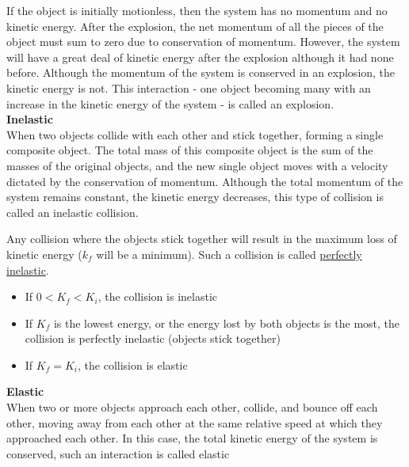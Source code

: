 \documentclass[a4paper]{article}
\let\bf\textbf
\begin{document}
If the object is initially motionless, then the system has no momentum and no kinetic energy. After the explosion, the net momentum of all the pieces of the object must sum to zero due to conservation of momentum. However, the system will have a great deal of kinetic energy after the explosion although it had none before. Although the momentum of the system is conserved in an explosion, the kinetic energy is not. This interaction - one object becoming many with an increase in the kinetic energy of the system - is called an explosion.
\vspace{2mm}\\
\bf{Inelastic}
\vspace{1mm}\\
When two objects collide with each other and stick together, forming a single composite object. The total mass of this composite object is the sum of the masses of the original objects, and the new single object moves with a velocity dictated by the conservation of momentum. Although the total momentum of the system remains constant, the kinetic energy decreases, this type of collision is called an inelastic collision.

Any collision where the objects stick together will result in the maximum loss of kinetic energy ($k_f$ will be a minimum). Such a collision is called \underline{perfectly inelastic}. 
\begin{itemize}
    \item If $0 < K_f < K_i$, the collision is inelastic
    \item If $K_f$ is the lowest energy, or the energy lost by both objects is the most, the collision is perfectly inelastic (objects stick together)
    \item If $K_f = K_i$, the collision is elastic
\end{itemize}
\bf{Elastic}
\vspace{1mm}\\
When two or more objects approach each other, collide, and bounce off each other, moving away from each other at the same relative speed at which they approached each other. In this case, the total kinetic energy of the system is conserved, such an interaction is called elastic
\end{document}
